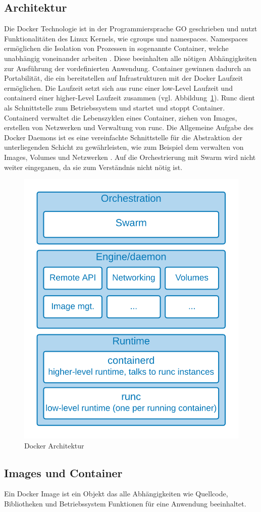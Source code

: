 \subsection{Architektur}
Die Docker Technologie ist in der Programmiersprache \glqq GO\grqq{} geschrieben und nutzt Funktionalitäten des
Linux Kernels, wie cgroups und namespaces.
Namespaces ermöglichen die Isolation von Prozessen in sogenannte Container, welche unabhängig voneinander arbeiten \cite{dockergetstarted}.
Diese beeinhalten alle nötigen Abhängigkeiten zur Ausführung der vordefinierten Anwendung.
Container gewinnen dadurch an Portabilität, die ein bereitstellen auf Infrastrukturen mit der Docker
Laufzeit ermöglichen.
Die Laufzeit setzt sich aus \glqq runc\grqq{} einer low-Level Laufzeit und \glqq containerd\grqq{} einer higher-Level
Laufzeit zusammen (vgl. Abbildung~\ref{fig:dockerarch}).
Runc dient als Schnittstelle zum Betriebssystem und startet und stoppt Container.
Containerd verwaltet die Lebenszyklen eines Container, ziehen von Images, erstellen von Netzwerken und
Verwaltung von runc.
Die Allgemeine Aufgabe des Docker Daemons ist es eine vereinfachte Schnittstelle für die Abstraktion
der unterliegenden Schicht zu gewährleisten, wie zum Beispiel dem verwalten von Images, Volumes und Netzwerken \cite{dockerdeep}.
Auf die Orchestrierung mit Swarm wird nicht weiter eingeganen, da sie zum Verständnis nicht nötig ist.

\begin{figure}
    \centering
    \includegraphics[width=0.5\columnwidth]{images/DockerArch.png}
    \caption{Docker Architektur \protect\cite{dockerdeep}}
    \label{fig:dockerarch}
\end{figure}

\subsection{Images und Container}
Ein Docker Image ist ein Objekt das alle Abhängigkeiten wie Quellcode, Bibliotheken und Betriebssystem
Funktionen für eine Anwendung beeinhaltet. 

